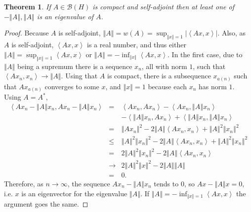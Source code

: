 \documentclass{article}
\newcommand{\inner}[2]{\left\langle #1, #2 \right\rangle}
\newcommand{\norm}[1]{\left\Vert #1 \right\Vert}
\newtheorem{theorem}{Theorem}
\theoremstyle{definition}
\begin{document}
\begin{theorem}
If $A \in \mathscr{B}(H)$ is compact and self-adjoint then at least one of $-\norm{A},\norm{A}$ is an eigenvalue of $A$.
\end{theorem}
\begin{proof}
Because $A$ is self-adjoint, $\norm{A}=w(A)=\sup_{\norm{x}=1} |\inner{Ax}{x}|$. Also, as $A$ is self-adjoint, $\inner{Ax}{x}$ is a real
number, and thus either $\norm{A}=\sup_{\norm{x}=1} \inner{Ax}{x}$ or $\norm{A}=-\inf_{\norm{x}} \inner{Ax}{x}$. 
In the first case, due to $\norm{A}$ being a supremum there is a sequence $x_n$, all with norm $1$, such that
$\inner{Ax_n}{x_n} \to \norm{A}$.
Using that $A$ is compact, there is a subsequence $x_{a(n)}$ such that $Ax_{a(n)}$ converges to some $x$, and $\norm{x}=1$
because each $x_n$ has norm $1$.
Using $A=A^*$,
\begin{eqnarray*}
\inner{Ax_n-\norm{A}x_n}{Ax_n-\norm{A}x_n}&=&\inner{Ax_n}{Ax_n}-\inner{Ax_n}{\norm{A}x_n}\\
&&-\inner{\norm{A}x_n}{Ax_n}+\inner{\norm{A}x_n}{\norm{A}x_n}\\
&=&\norm{Ax_n}^2-2\norm{A}\inner{Ax_n}{x_n}+\norm{A}^2 \norm{x_n}^2\\
&\leq&\norm{A}^2 \norm{x_n}^2 -2\norm{A}\inner{Ax_n}{x_n}+\norm{A}^2 \norm{x_n}^2\\
&=&2\norm{A}^2 \norm{x_n}^2 -2\norm{A}\inner{Ax_n}{x_n}\\
&\to&2\norm{A}^2 \norm{x}^2 -2\norm{A}\norm{A}\\
&=&0.
\end{eqnarray*}
Therefore, as $n \to \infty$, the sequence $Ax_n - \norm{A}x_n$ tends to $0$, so $Ax-\norm{A}x=0$, i.e. $x$ is an eigenvector for the eigenvalue
$\norm{A}$. If $\norm{A}=-\inf_{\norm{x}=1} \inner{Ax}{x}$ the argument goes the same.
\end{proof}
\end{document}

